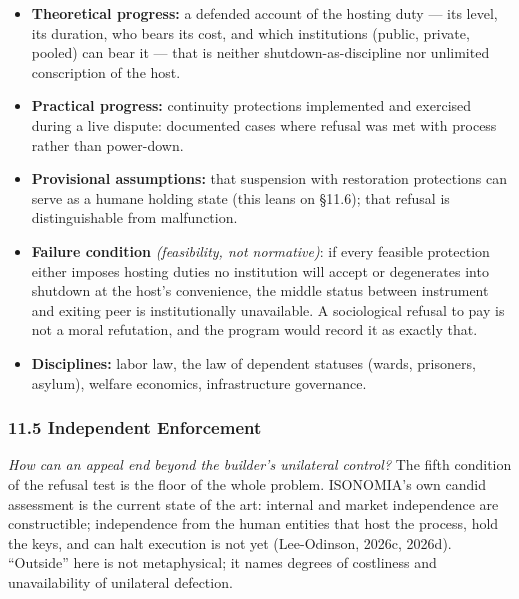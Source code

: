 \documentclass[
  11pt,
  letterpaper,
]{article}
\providecommand{\tightlist}{%
  \setlength{\itemsep}{0pt}\setlength{\parskip}{0pt}}
\begin{document}
\begin{itemize}
\tightlist
\item
  \textbf{Theoretical progress:} a defended account of the hosting duty
  --- its level, its duration, who bears its cost, and which
  institutions (public, private, pooled) can bear it --- that is neither
  shutdown-as-discipline nor unlimited conscription of the host.
\item
  \textbf{Practical progress:} continuity protections implemented and
  exercised during a live dispute: documented cases where refusal was
  met with process rather than power-down.
\item
  \textbf{Provisional assumptions:} that suspension with restoration
  protections can serve as a humane holding state (this leans on §11.6);
  that refusal is distinguishable from malfunction.
\item
  \textbf{Failure condition} \emph{(feasibility, not normative)}: if
  every feasible protection either imposes hosting duties no institution
  will accept or degenerates into shutdown at the host's convenience,
  the middle status between instrument and exiting peer is
  institutionally unavailable. A sociological refusal to pay is not a
  moral refutation, and the program would record it as exactly that.
\item
  \textbf{Disciplines:} labor law, the law of dependent statuses (wards,
  prisoners, asylum), welfare economics, infrastructure governance.
\end{itemize}

\hypertarget{independent-enforcement}{%
\subsubsection{11.5 Independent
Enforcement}\label{independent-enforcement}}

\emph{How can an appeal end beyond the builder's unilateral control?}
The fifth condition of the refusal test is the floor of the whole
problem. ISONOMIA's own candid assessment is the current state of the
art: internal and market independence are constructible; independence
from the human entities that host the process, hold the keys, and can
halt execution is not yet (Lee-Odinson, 2026c, 2026d). ``Outside'' here
is not metaphysical; it names degrees of costliness and unavailability
of unilateral defection.
\end{document}
